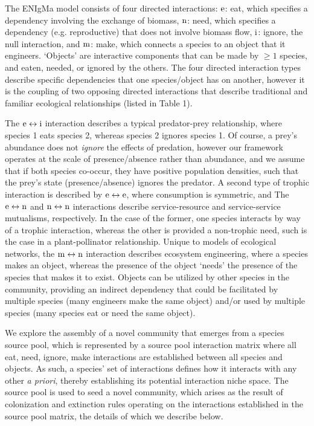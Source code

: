 \documentclass[twocolumn,preprintnumbers,amsmath,amssymb,superscriptaddress]{revtex4}
\newcommand{\rr}[1]{{\rm #1}}
\begin{document}

The ENIgMa model consists of four directed interactions:
$\rr{e}$: eat, which specifies a dependency involving the exchange of biomass,
$\rr{n}$: need, which specifies a dependency (e.g. reproductive) that does not involve biomass flow,
$\rr{i}$: ignore, the null interaction, and
$\rr{m}$: make, which connects a species to an object that it engineers. 
`Objects' are interactive components that can be made by $\geq 1$ species, and eaten, needed, or ignored by the others.
The four directed interaction types describe specific dependencies that one species/object has on another, however it is the coupling of two opposing directed interactions that describe traditional and familiar ecological relationships (listed in Table 1).

The $\rr{e} \leftrightarrow \rr{i}$ interaction describes a typical predator-prey relationship, where species 1 eats species 2, whereas species 2 ignores species 1.
Of course, a prey's abundance does not \emph{ignore} the effects of predation, however our framework operates at the scale of presence/absence rather than abundance, and we assume that if both species co-occur, they have positive population densities, such that the prey's state (presence/absence) ignores the predator.
A second type of trophic interaction is described by $\rr{e} \leftrightarrow \rr{e}$, where consumption is symmetric, and 
The $\rr{e} \leftrightarrow \rr{n}$ and $\rr{n} \leftrightarrow \rr{n}$ interactions describe service-resource and service-service mutualisms, respectively.
In the case of the former, one species interacts by way of a trophic interaction, whereas the other is provided a non-trophic need, such is the case in a plant-pollinator relationship.
Unique to models of ecological networks, the $\rr{m} \leftrightarrow \rr{n}$ interaction describes ecosystem engineering, where a species makes an object, whereas the presence of the object `needs' the presence of the species that makes it to exist.
Objects can be utilized by other species in the community, providing an indirect dependency that could be facilitated by multiple species (many engineers make the same object) and/or used by multiple species (many species eat or need the same object).

We explore the assembly of a novel community that emerges from a species source pool, which is represented by a source pool interaction matrix where all eat, need, ignore, make interactions are established between all species and objects.
As such, a species' set of interactions defines how it interacts with any other \emph{a priori}, thereby establishing its potential interaction niche space.
The source pool is used to seed a novel community, which arises as the result of colonization and extinction rules operating on the interactions established in the source pool matrix, the details of which we describe below.
\end{document}
